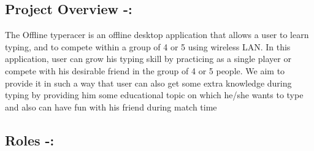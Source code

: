 \documentclass[]{article}
\begin{document}
\subsection{Project Overview -:}
The Offline typeracer is an offline desktop application that allows a user to learn typing,
and to compete within a group of 4 or 5 using wireless LAN. In this application, user can grow
his typing skill by practicing as a single player or compete with his desirable friend in the group
of 4 or 5 people. We aim to provide it in such a way that user can also get some extra knowledge
during typing by providing him some educational topic on which he/she wants to type and also
can have fun with his friend during match time

\subsection{Roles -:}
\end{document}
